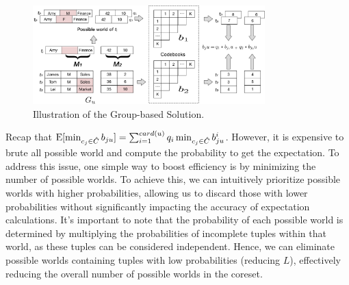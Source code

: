 \begin{figure}[t]
    \centering
    \includegraphics[width=0.8\textwidth]{figs/distance}
    \caption{Illustration of the Group-based Solution.}
    \label{fig:distance}
\end{figure}


Recap that $\mathrm{E}[\min_{c_j\in \hat {C}}b_{ju}] = \sum_{i=1}^{card(u)} q_i \min_{c_j \in \hat{C}} b_{ju}^i$. However, it is expensive to brute all possible world and compute the probability to get the expectation. To address this issue, one simple way to boost efficiency is by minimizing the number of possible worlds. To achieve this, we can intuitively prioritize possible worlds with higher probabilities, allowing us to discard those with lower probabilities without significantly impacting the accuracy of expectation calculations. It's important to note that the probability of each possible world is determined by multiplying the probabilities of incomplete tuples within that world, as these tuples can be considered independent. Hence, we can eliminate possible worlds containing tuples with low probabilities (\ie reducing $L$), effectively reducing the overall number of possible worlds in the coreset.



